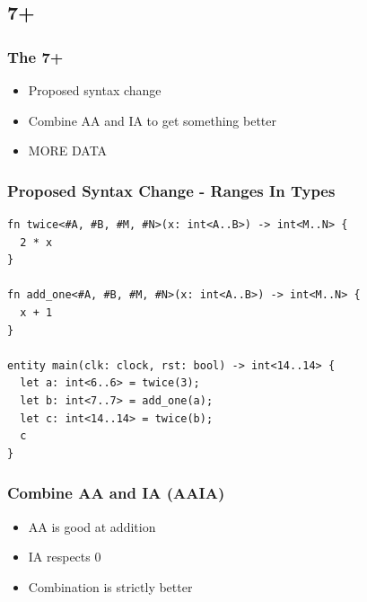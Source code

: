\documentclass{beamer}
\begin{document}
\subsection{7+}

\begin{frame}
\frametitle{The 7+}

\begin{itemize}
  \item Proposed syntax change
  \item Combine AA and IA to get something better
  \item MORE DATA
\end{itemize}
\end{frame}

\begin{frame}[containsverbatim]
\frametitle{Proposed Syntax Change - Ranges In Types}

\small
\begin{verbatim}
fn twice<#A, #B, #M, #N>(x: int<A..B>) -> int<M..N> {
  2 * x
}

fn add_one<#A, #B, #M, #N>(x: int<A..B>) -> int<M..N> {
  x + 1
}

entity main(clk: clock, rst: bool) -> int<14..14> {
  let a: int<6..6> = twice(3);
  let b: int<7..7> = add_one(a);
  let c: int<14..14> = twice(b);
  c
}
\end{verbatim}
\end{frame}

\begin{frame}[containsverbatim]
\frametitle{Combine AA and IA (AAIA)}
\begin{itemize}
  \item AA is good at addition
  \item IA respects 0
  \item Combination is strictly better
\end{itemize}
\end{frame}
\end{document}
